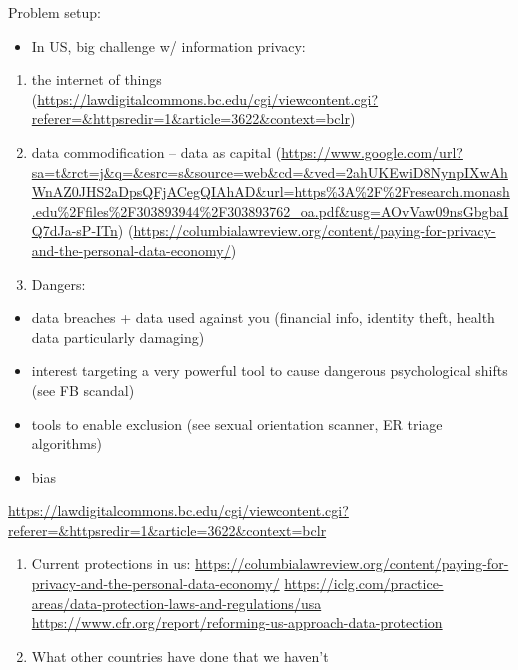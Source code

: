 \documentclass[water,article,submit,moreauthors,pdftex]{mdpi}
\providecommand{\tightlist}{%
  \setlength{\itemsep}{0pt}\setlength{\parskip}{4pt}}
\begin{document}

Problem setup:

\begin{itemize}
\tightlist
\item
  In US, big challenge w/ information privacy:
\end{itemize}

\begin{enumerate}
\def\labelenumi{\arabic{enumi}.}
\item
  the internet of things
  (\url{https://lawdigitalcommons.bc.edu/cgi/viewcontent.cgi?referer=\&httpsredir=1\&article=3622\&context=bclr})
\item
  data commodification -- data as capital
  (\url{https://www.google.com/url?sa=t\&rct=j\&q=\&esrc=s\&source=web\&cd=\&ved=2ahUKEwiD8NynpIXwAhWnAZ0JHS2aDpsQFjACegQIAhAD\&url=https\%3A\%2F\%2Fresearch.monash.edu\%2Ffiles\%2F303893944\%2F303893762_oa.pdf\&usg=AOvVaw09nsGbgbaIQ7dJa-sP-ITn})
  (\url{https://columbialawreview.org/content/paying-for-privacy-and-the-personal-data-economy/})
\item
  Dangers:
\end{enumerate}

\begin{itemize}
\tightlist
\item
  data breaches + data used against you (financial info, identity theft,
  health data particularly damaging)
\item
  interest targeting a very powerful tool to cause dangerous
  psychological shifts (see FB scandal)
\item
  tools to enable exclusion (see sexual orientation scanner, ER triage
  algorithms)
\item
  bias
\end{itemize}

\url{https://lawdigitalcommons.bc.edu/cgi/viewcontent.cgi?referer=\&httpsredir=1\&article=3622\&context=bclr}

\begin{enumerate}
\def\labelenumi{\arabic{enumi}.}
\setcounter{enumi}{3}
\item
  Current protections in us:
  \url{https://columbialawreview.org/content/paying-for-privacy-and-the-personal-data-economy/}
  \url{https://iclg.com/practice-areas/data-protection-laws-and-regulations/usa}
  \url{https://www.cfr.org/report/reforming-us-approach-data-protection}
\item
  What other countries have done that we haven't
\end{enumerate}
\end{document}
